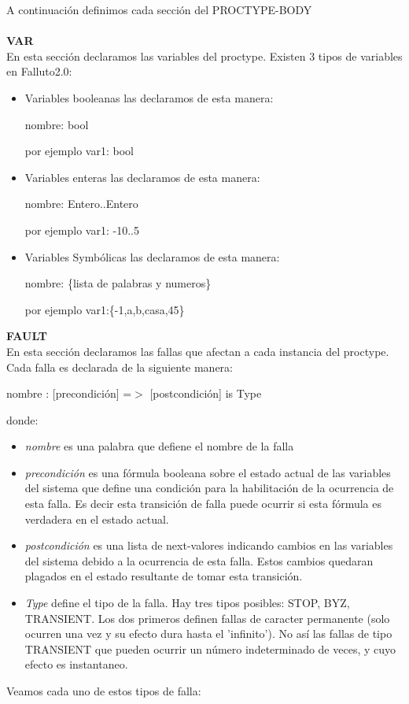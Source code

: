 \documentclass[titlepage, 12pt]{book}
\begin{document}
\noindent A continuaci\'on definimos cada secci\'on del PROCTYPE-BODY\\\\
\textbf{VAR}\\
\indent En esta secci\'on declaramos las variables del proctype. Existen 3 tipos de variables en Falluto2.0:
\begin{itemize}
\item Variables booleanas
las declaramos de esta manera: \begin{center} nombre: bool \end{center}
por ejemplo var1: bool
\item Variables enteras
las declaramos de esta manera: \begin{center} nombre: Entero..Entero \end{center}
por ejemplo var1: -10..5
\item Variables Symb\'olicas
las declaramos de esta manera: \begin{center} nombre: \{lista de palabras y numeros\} \end{center}
por ejemplo var1:\{-1,a,b,casa,45\}\\
\end{itemize}

\noindent \textbf{FAULT}\\
\indent En esta secci\'on declaramos las fallas que afectan a cada instancia del proctype. Cada falla es declarada de la siguiente manera:

\begin{center}nombre : [precondici\'on] =$>$ [postcondici\'on] is Type \end{center}
donde:
\begin{itemize}
\item \textit{nombre} es una palabra que defiene el nombre de la falla
\item \textit{precondici\'on} es una f\'ormula booleana sobre el estado actual de las variables del sistema que define una condici\'on para la habilitaci\'on de la ocurrencia de esta falla. Es decir esta transici\'on de falla puede ocurrir si esta f\'ormula es verdadera en el estado actual.
\item \textit{postcondici\'on} es una lista de next-valores indicando cambios en las variables del sistema debido a la ocurrencia de esta falla. Estos cambios quedaran plagados en el estado resultante de tomar esta transici\'on.
\item \textit{Type} define el tipo de la falla. Hay tres tipos posibles: STOP, BYZ, TRANSIENT. Los dos primeros definen fallas de caracter permanente (solo ocurren una vez y su efecto dura hasta el 'infinito'). No as\'i las fallas de tipo TRANSIENT que pueden ocurrir un n\'umero indeterminado de veces, y cuyo efecto es instantaneo.\\
\end{itemize}
Veamos cada uno de estos tipos de falla:\\
\end{document}

